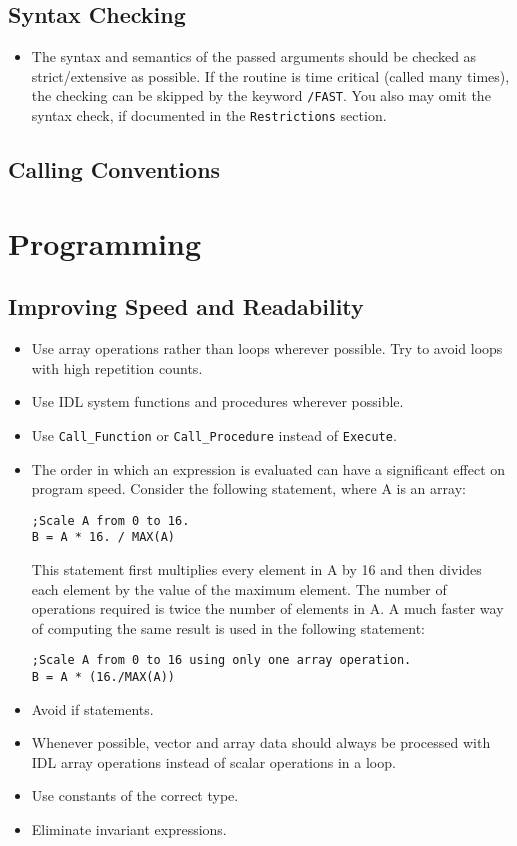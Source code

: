 \documentclass[12pt]{article}
\begin{document}
\subsection{Syntax Checking}
\begin{itemize}
\item The syntax and semantics of the passed arguments should be checked as strict/extensive as possible. If the routine is time critical (called many times), the checking can be skipped by the keyword \texttt{/FAST}. You also may omit the syntax check, if documented in the \texttt{Restrictions} section. 
\end{itemize}
\subsection{Calling Conventions}

\section{Programming}


\subsection{Improving Speed and Readability}

\begin{itemize}
\item Use array operations rather than loops wherever possible. Try to avoid loops with high repetition counts.
\item Use IDL system functions and procedures wherever possible.
\item Use \texttt{Call\_Function} or \texttt{Call\_Procedure} instead of \texttt{Execute}.
\item The order in which an expression is evaluated can have a significant effect on program speed. Consider the following statement, where A is an array:
\begin{verbatim}
;Scale A from 0 to 16.
B = A * 16. / MAX(A)
\end{verbatim}
This statement first multiplies every element in A by 16 and then divides each element by the value of the maximum element. The number of operations required is twice the number of elements in A. A much faster way of computing the same result is used in the following statement:
\begin{verbatim}
;Scale A from 0 to 16 using only one array operation.
B = A * (16./MAX(A))
\end{verbatim}
\item Avoid if statements.
\item Whenever possible, vector and array data should always be processed with IDL array operations instead of scalar operations in a loop. 
\item Use constants of the correct type.
\item Eliminate invariant expressions.
\end{itemize}
\end{document}
